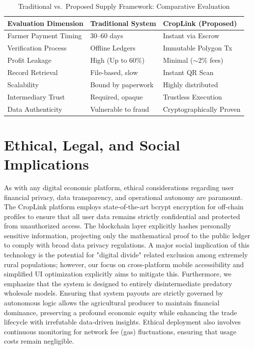\documentclass[conference]{IEEEtran}
\begin{document}
\begin{table}[t]
\caption{Traditional vs.\ Proposed Supply Framework: Comparative Evaluation}
\label{tab:comparison}
\centering
\begin{tabular}{@{}p{3.5cm}p{2.2cm}p{2.3cm}@{}}
\toprule
\textbf{Evaluation Dimension} & \textbf{Traditional System} & \textbf{CropLink (Proposed)} \\
\midrule
Farmer Payment Timing & 30--60 days & Instant via Escrow \\
Verification Process & Offline Ledgers & Immutable Polygon Tx \\
Profit Leakage & High (Up to 60\%) & Minimal ($\sim$2\% fees) \\
Record Retrieval & File-based, slow & Instant QR Scan \\
Scalability & Bound by paperwork & Highly distributed \\
Intermediary Trust & Required, opaque & Trustless Execution \\
Data Authenticity & Vulnerable to fraud & Cryptographically Proven \\
\bottomrule
\end{tabular}
\end{table}

\section{Ethical, Legal, and Social Implications}
As with any digital economic platform, ethical considerations regarding user financial privacy, data transparency, and operational autonomy are paramount. The CropLink platform employs state-of-the-art bcrypt encryption for off-chain profiles to ensure that all user data remains strictly confidential and protected from unauthorized access. The blockchain layer explicitly hashes personally sensitive information, projecting only the mathematical proof to the public ledger to comply with broad data privacy regulations. A major social implication of this technology is the potential for "digital divide" related exclusion among extremely rural populations; however, our focus on cross-platform mobile accessibility and simplified UI optimization explicitly aims to mitigate this. Furthermore, we emphasize that the system is designed to entirely disintermediate predatory wholesale models. Ensuring that system payouts are strictly governed by autonomous logic allows the agricultural producer to maintain financial dominance, preserving a profound economic equity while enhancing the trade lifecycle with irrefutable data-driven insights. Ethical deployment also involves continuous monitoring for network fee (gas) fluctuations, ensuring that usage costs remain negligible.
\end{document}
